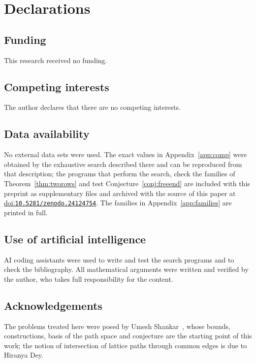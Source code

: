 \documentclass[11pt]{amsart}
\theoremstyle{definition}
\theoremstyle{remark}
\numberwithin{equation}{section}
\providecommand{\doi}[1]{\href{https://doi.org/#1}{doi:\nolinkurl{#1}}}
\begin{document}
\section*{Declarations}

\subsection*{Funding} This research received no funding.

\subsection*{Competing interests} The author declares that there are no competing interests.

\subsection*{Data availability} No external data sets were used. The exact values in Appendix~\ref{app:comp} were obtained by the exhaustive search described there and can be reproduced from that description; the programs that perform the search, check the families of Theorem~\ref{thm:tworows} and test Conjecture~\ref{conj:freeend} are included with this preprint as supplementary files and archived with the source of this paper at \doi{10.5281/zenodo.24124754}. The families in Appendix~\ref{app:families} are printed in full.

\subsection*{Use of artificial intelligence} AI coding assistants were used to write and test the search programs and to check the bibliography. All mathematical arguments were written and verified by the author, who takes full responsibility for the content.

\subsection*{Acknowledgements} The problems treated here were posed by Umesh Shankar~\cite{Sh}, whose bounds, constructions, basis of the path space and conjecture are the starting point of this work; the notion of intersection of lattice paths through common edges is due to Hiranya Dey.
\end{document}
